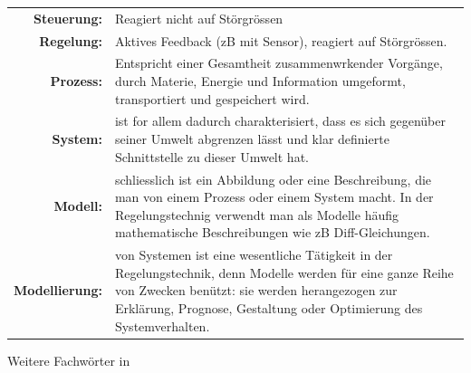 \begin{table}[h]
\begin{tabular}{r p{6.5cm}}
	\textbf{Steuerung:} & Reagiert nicht auf Störgrössen\\
	\textbf{Regelung:} & Aktives Feedback (zB mit Sensor), reagiert auf Störgrössen.   \\
	\textbf{Prozess:} & Entspricht einer Gesamtheit zusammenwrkender Vorgänge, durch Materie, Energie und Information umgeformt, transportiert und gespeichert wird.\\
	\textbf{System:} & ist for allem dadurch charakterisiert, dass es sich gegenüber seiner Umwelt abgrenzen lässt und klar definierte Schnittstelle zu dieser Umwelt hat. \\
	\textbf{Modell:} & schliesslich ist ein Abbildung oder eine Beschreibung, die man von einem Prozess oder einem System macht. In der Regelungstechnig verwendt man als Modelle häufig mathematische Beschreibungen wie zB Diff-Gleichungen.\\
	\textbf{Modellierung:} & von Systemen ist eine wesentliche Tätigkeit in der Regelungstechnik, denn Modelle werden für eine ganze Reihe von Zwecken benützt: sie werden herangezogen zur Erklärung, Prognose, Gestaltung oder Optimierung des Systemverhalten.
\end{tabular}
\end{table}
Weitere Fachwörter in 
